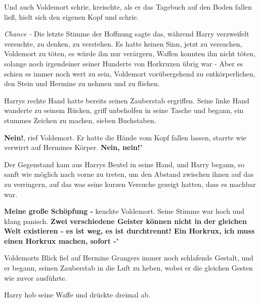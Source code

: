 Und auch Voldemort schrie, kreischte, als er das Tagebuch auf den Boden fallen
ließ, hielt sich den eigenen Kopf und schrie.

\emph{Chance -} Die letzte Stimme der Hoffnung sagte das, während Harry
verzweifelt versuchte, zu denken, zu verstehen. Es hatte keinen Sinn, jetzt zu
versuchen, Voldemort zu töten, es würde ihn nur verärgern, Waffen konnten ihn
nicht töten, solange noch irgendeiner seiner Hunderte von Horkruxen übrig war -
Aber es schien es immer noch wert zu sein, Voldemort vorübergehend zu
entkörperlichen, den Stein und Hermine zu nehmen und zu fliehen.

Harrys rechte Hand hatte bereits seinen Zauberstab ergriffen. Seine linke Hand
wanderte zu seinem Rücken, griff unbeholfen in seine Tasche und begann, ein
stummes Zeichen zu machen, sieben Buchstaben.

\glqq \textbf{Nein!}\grqq{}, rief Voldemort. Er hatte die Hände vom Kopf fallen
lassen, starrte wie verwirrt auf Hermines Körper. \glqq \textbf{Nein, nein!}"

Der Gegenstand kam aus Harrys Beutel in seine Hand, und Harry begann, so sanft
wie möglich nach vorne zu treten, um den Abstand zwischen ihnen auf das zu
verringern, auf das was seine kurzen Versuche gezeigt hatten, dass es machbar
war.

\glqq \textbf{Meine große Schöpfung -}\grqq{} keuchte Voldemort. Seine Stimme
war hoch und klang panisch. \glqq \textbf{Zwei verschiedene Geister können nicht
in der gleichen Welt existieren - es ist weg, es ist durchtrennt! Ein Horkrux,
ich muss einen Horkrux machen, sofort -}"

Voldemorts Blick fiel auf Hermine Grangers immer noch schlafende Gestalt, und er
begann, seinen Zauberstab in die Luft zu heben, wobei er die gleichen Gesten wie
zuvor ausführte.

Harry hob seine Waffe und drückte dreimal ab.

